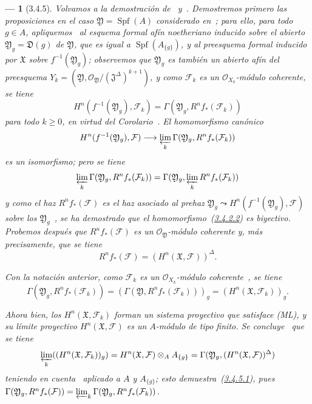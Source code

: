 \documentclass[10pt,oneside,openany]{book}
\theoremstyle{egaenv}\newtheorem*{env}{---}
\theoremstyle{egastatement}
\theoremstyle{egadescription}
\newcommand{\oldpage}[2][]{\marginnote{\normalfont\scriptsize\textbf{#1}\,|\,#2}\ignorespaces}
\renewcommand{\geq}{\geqslant}
\begin{document}
\begin{env}[3.4.5]
\label{III.3.4.5}
\label{III.3.4.5-fr}
Volvamos a la demostración de~ y~.
Demostremos primero las proposiciones en el caso $\mathfrak Y=\operatorname{Spf}(A)$ considerado en~; para ello, para todo $g\in A$, apliquemos~ al esquema formal afín noetheriano inducido sobre el abierto $\mathfrak Y_g=\mathfrak D(g)$ de $\mathfrak Y$, que es igual a $\operatorname{Spf}(A_{\{g\}})$, y al preesquema formal inducido por $\mathfrak X$ sobre $f^{-1}(\mathfrak Y_g)$; observemos que $\mathfrak Y_g$ es también un abierto afín del preesquema $Y_k=(\mathfrak Y,\mathcal O_{\mathfrak Y}/(\mathfrak J^\Delta)^{k+1})$, y como $\mathcal F_k$ es un $\mathcal O_{X_k}$-módulo coherente, se tiene
\[
H^n(f^{-1}(\mathfrak Y_g),\mathcal F_k)
=\Gamma(\mathfrak Y_g,R^nf_*(\mathcal F_k))
\]
para todo $k\geq0$, en virtud del Corolario~.
El homomorfismo canónico
\[
H^n(f^{-1}(\mathfrak Y_g),\mathcal F)
\longrightarrow\varprojlim_k\Gamma(\mathfrak Y_g,R^nf_*(\mathcal F_k))
\]
es un isomorfismo; pero se tiene~
\[
\varprojlim_k\Gamma(\mathfrak Y_g,R^nf_*(\mathcal F_k))
=\Gamma(\mathfrak Y_g,\varprojlim_kR^nf_*(\mathcal F_k))
\]
\oldpage[III]{122}
y como el haz $R^nf_*(\mathcal F)$ es el haz asociado al prehaz $\mathfrak Y_g\leadsto H^n(f^{-1}(\mathfrak Y_g),\mathcal F)$ sobre los $\mathfrak Y_g$~, se ha demostrado que el homomorfismo~(\hyperref[III.3.4.2.2]{3.4.2.2}) es \emph{biyectivo}.
Probemos después que $R^nf_*(\mathcal F)$ es un $\mathcal O_{\mathfrak Y}$-módulo coherente y, más precisamente, que se tiene
\[
R^nf_*(\mathcal F)=(H^n(\mathfrak X,\mathcal F))^\Delta.
\tag{3.4.5.1}\label{III.3.4.5.1-fr}
\]

Con la notación anterior, como $\mathcal F_k$ es un $\mathcal O_{X_k}$-módulo coherente~, se tiene
\[
\Gamma(\mathfrak Y_g,R^nf_*(\mathcal F_k))
=(\Gamma(\mathfrak Y,R^nf_*(\mathcal F_k)))_g
=(H^n(\mathfrak X,\mathcal F_k))_g.
\]

Ahora bien, los $H^n(\mathfrak X,\mathcal F_k)$ forman un sistema proyectivo que satisface (ML), y su límite proyectivo $H^n(\mathfrak X,\mathcal F)$ es un $A$-módulo de tipo finito.
Se concluye~ que se tiene
\[
\varprojlim_k((H^n(\mathfrak X,\mathcal F_k))_g)
=H^n(\mathfrak X,\mathcal F)\otimes_AA_{\{g\}}
=\Gamma(\mathfrak Y_g,(H^n(\mathfrak X,\mathcal F))^\Delta)
\]
teniendo en cuenta~ aplicado a $A$ y $A_{\{g\}}$; esto demuestra~(\hyperref[III.3.4.5.1]{3.4.5.1}), pues $\Gamma(\mathfrak Y_g,R^nf_*(\mathcal F))
=\varprojlim_k\Gamma(\mathfrak Y_g,R^nf_*(\mathcal F_k))$.


\end{env}
\end{document}
